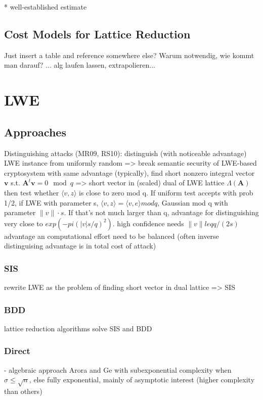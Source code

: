   * well-established estimate \cite{LP11}




\subsection{Cost Models for Lattice Reduction}
Just insert a table and reference somewhere else? Warum notwendig, wie kommt man darauf? ... alg laufen lassen, extrapolieren...


\section{LWE}
\subsection{Approaches}
Distinguishing attacks (MR09, RS10): distinguish (with noticeable advantage) LWE instance from uniformly random => break semantic security of LWE-based cryptosystem with same advantage (typically), find short nonzero integral vector $\textbf{v}$ s.t. $\textbf{A}^t \textbf{v} = 0 \mod q$ => short vector in (scaled) dual of LWE lattice $\Lambda(\textbf{A})$ %
then test whether $\langle v, z \rangle$ is close to zero mod q. If uniform test accepts with prob 1/2, if LWE with parameter s, $\langle v, z \rangle = \langle v, e \rangle mod q$, Gaussian mod q with parameter $\| v \| \cdot s$. If that's not much larger than q, advantage for distinguishing very close to $exp(-pi (|v| s/q)^2)$. high confidence needs $\| v \| leq q/(2s)$ 
advantage an computational effort need to be balanced (often inverse distinguising advantage is in total cost of attack)

\subsubsection{SIS}
rewrite LWE as the problem of finding short vector in dual lattice => SIS
\subsubsection{BDD}

lattice reduction algorithms solve SIS and BDD 
\subsubsection{Direct}

- algebraic approach Arora and Ge with subexponential complexity when $\sigma \leq \sqrt{n}$, else fully exponential, mainly of asymptotic interest (higher complexity than others)

